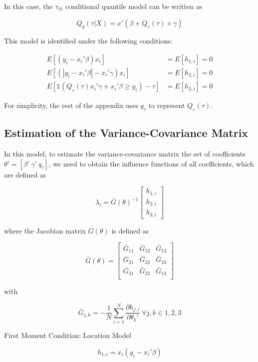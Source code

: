 \documentclass[
  12pt,
  oneside]{article}
\begin{document}
In this case, the \(\tau_{th}\) conditional quantile model can be
written as

\[Q_y(\tau|X) = x'(\beta +Q_\varepsilon(\tau)  \times \gamma)\]

This model is identified under the following conditions:

\[\begin{aligned}
  E[(y_i-x_i'\beta)x_i ]  &= E[h_{1,i}]=0 \\
  E[ (|y_i-x_i'\beta|-x_i' \gamma) x_i ] &=E[h_{2,i}]=0 \\
  E\left[  \mathbb{1}\left( Q_\varepsilon(\tau) x_i'\gamma +x_i'\beta\geq  y_i  \right) - \tau \right] 
   &=E[h_{3,i}]=0 
\end{aligned}
\]

For simplicity, the rest of the appendix uses \(q_\tau\) to represent
\(Q_\varepsilon(\tau)\).

\subsection{Estimation of the Variance-Covariance
Matrix}\label{estimation-of-the-variance-covariance-matrix}

In this model, to estimate the variance-covariance matrix the set of
coefficients \(\theta'=[\beta' \ \gamma' \ q_\tau]\), we need to obtain
the influence functions of all coefficients, which are defined as

\[\lambda_i = \bar G(\theta)^{-1}
\begin{bmatrix}
h_{1,i} \\
h_{2,i} \\
h_{3,i}
\end{bmatrix}
\]

where the Jacobian matrix \(\bar G(\theta)\) is defined as

\[\bar G(\theta) = \begin{bmatrix}
\bar G_{11} & \bar G_{12} & \bar G_{13} \\
\bar G_{21} & \bar G_{22} & \bar G_{23} \\
\bar G_{31} & \bar G_{32} & \bar G_{13} \\
\end{bmatrix}
\]

with

\[\bar G_{j,k} = - \frac 1 N \sum_{i=1}^N \frac{\partial h_{j,i}}{\partial \theta_k'} \ \forall j,k \in 1,2,3
\]

First Moment Condition: Location Model

\[h_{1,i}=x_i(y_i-x_i'\beta)\]
\end{document}
